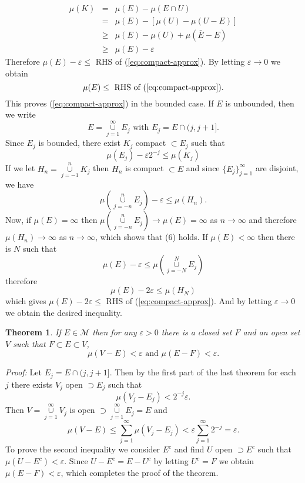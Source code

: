 \documentclass[12pt]{report}
\newtheorem{theorem}{Theorem}[section]
\begin{document}
\begin{eqnarray*}
\mu(K) &=& \mu(E) - \mu(E \cap U)\\ &=& \mu(E) - [\mu(U) - \mu(U -
E)]\\ &\ge& \mu(E) - \mu(U) + \mu(\bar E - E)\\ &\ge& \mu(E) -
\varepsilon
\end{eqnarray*} Therefore $\mu(E) - \varepsilon \le$ RHS of
(\ref{eq:compact-approx}).  By letting $\varepsilon \to 0 $ we obtain
\begin{equation}\label{eq:compact-approx.2}
\mu(E) \le \mbox{ RHS of (\ref{eq:compact-approx})}.
\end{equation} 
This proves (\ref{eq:compact-approx}) in the bounded case.
If $E$ is unbounded, then we write
\[  E = \overset{\infty}{\underset{j=1}{\cup}} E_j \mbox{ with } E_j = E \cap
(j, j + 1].
\] Since $E_j$ is bounded,  there exist $K_j$ compact $\subset E_j$ such
that
\[
\mu(E_j) - \varepsilon 2^{-j} \le \mu(K_j)
\] If we let $H_n =\overset{n}{\underset{j=-1}{\cup}} K_j$ then $H_n$ is
compact $\subset E$ and since
$\{E_j\}^\infty_{j=1}$ are disjoint, we have
\[
\mu \left ( \overset{n}{\underset{j=-n}{\cup}} E_j \right ) - \varepsilon \le
\mu(H_n).
\] Now, if $\mu (E) = \infty$ then $\mu \left
(\overset{n}{\underset{j=-n}{\cup}} E_j
\right )
\longrightarrow \mu(E) = \infty$ as $n \to \infty$ and therefore $\mu(H_n)
\longrightarrow \infty$ as $n \to \infty$, which shows that (6) holds.  If
$\mu (E) <
\infty$ then there is $N$ such that
\[
\mu(E) - \varepsilon \le \mu \left ( \overset{N}{\underset{j=-N}{\cup}} E_j
\right )
\] therefore
\[
\mu(E) - 2\varepsilon \le \mu(H_N)
\] which gives $\mu(E) - 2 \varepsilon \le $ RHS of
(\ref{eq:compact-approx}).  And by letting
$\varepsilon
\to 0$ we obtain the desired inequality.




\begin{theorem}
If $E \in \mathcal{M}$ then for any $\varepsilon
> 0$ there is a closed set $F$ and an open set $V$ such that $F \subset E
\subset V$,
\[
\mu(V - E) < \varepsilon \mbox{ and } \mu(E - F) < \varepsilon.
\]
\end{theorem}
\textit{Proof:}  Let $E_j = E \cap (j, j + 1]$.   Then by the first part of the
last theorem for each $j$ there exists $V_j$ open $\supset E_j$ such that
\[
\mu(V_j - E_j) < 2^{-j} \varepsilon.
\] Then $V = \overset{\infty}{\underset{j=1}{\cup}} V_j$ is open $\supset
\overset{\infty}{\underset{j=1}{\cup}} E_j = E$ and
\[
\mu (V - E) \le \sum^\infty_{j=1} \mu(V_j - E_j) < \varepsilon
\sum^\infty_{j=1} 2^{-j}  = \varepsilon.
\] To prove the second inequality we consider $E^c$ and find $U$ open
$\supset E^c$ such that $\mu(U - E^c) < \varepsilon$.  Since $U - E^c = E -
U^c$ by letting $U^c = F$ we obtain $\mu(E-F) < \varepsilon$, which
completes the proof of the theorem.
\end{document}
